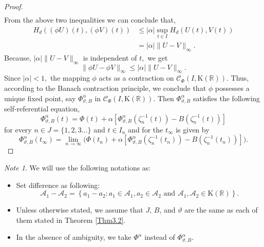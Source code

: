 \documentclass[12pt,oneside,reqno]{amsart}
\theoremstyle{definition}
\theoremstyle{remark}
\newtheorem{note}[theorem]{Note}
\begin{document}
\begin{proof}
\begin{align*}
   \end{align*}
   From the above two inequalities we can conclude that,
   \begin{align*}
       H_d((\phi U)(t),(\phi V)(t)) &\le \lvert \alpha \rvert\sup_{t \in I} H_d( U(t),V(t))\\ 
     &=\lvert \alpha \rvert\lVert U-V\rVert _{\infty}.
   \end{align*}
Because, $ \lvert \alpha \rvert\lVert U-V\rVert _{\infty} $ is independent of $t,$ we get
   \begin{equation*}
    \lVert \phi U-\phi V\rVert _{\infty}
     \le   \lvert \alpha \rvert\lVert U-V\rVert _{\infty}.  
   \end{equation*}
  Since $\lvert \alpha \rvert < 1,$ the mapping $\phi$ acts as a contraction on $\mathcal{C}_\Phi( I, \mathrm{K}( \mathbb{R}) )$. Thus, according to the Banach contraction principle, we conclude that $\phi$ possesses a unique fixed point, say $\Phi^{\alpha}_{\vartheta,B}$ in $\mathcal{C}_\Phi(I,\mathrm{K}(\mathbb{R}))$. Then $\Phi^{\alpha}_{\vartheta,B}$  satisfies the following self-referential equation,
  \[\Phi^{\alpha}_{\vartheta,B}(t)= \Phi(t) + \alpha  [\Phi^{\alpha}_{\vartheta,B}(\zeta_n^{-1}(t)) - B(\zeta_n^{-1}(t))]\]
   for every  $n \in J=\{1,2,3\ldots\}$ and $t \in I_n$ and for the  $t_\infty$ is given by
   \[  \Phi^{\alpha}_{\vartheta,B}(t_\infty)=\underset{n \rightarrow \infty}{\lim}\Big( \Phi(t_n) + \alpha [\Phi^{\alpha}_{\vartheta,B}(\zeta_n^{-1}(t_n)) - B(\zeta_n^{-1}(t_n))]\Big).\]
   
   \end{proof}
  
\begin{note}\label{unchange}
We will use the following notations as:
\begin{itemize}
\item Set difference as following:
    \[\mathcal{A}_1-\mathcal{A }_2=\left\{a_1-a_2: a_1\in \mathcal{A}_1, a_2 \in \mathcal{A}_2 \text{ and } \mathcal{A}_1,\mathcal{A}_2\in \mathrm{K}(\mathbb{R})\right\}.\]
    \item Unless otherwise stated, we assume that $J$, $B$, and $\vartheta$ are the same as each of them stated in  Theorem \ref{Thm3.2}.
    \item In the absence of ambiguity, we take $\Phi^{\alpha} $ instead of  $\Phi^{\alpha}_{\vartheta,B}$.
\end{itemize}

\end{note}
  
\end{document}
